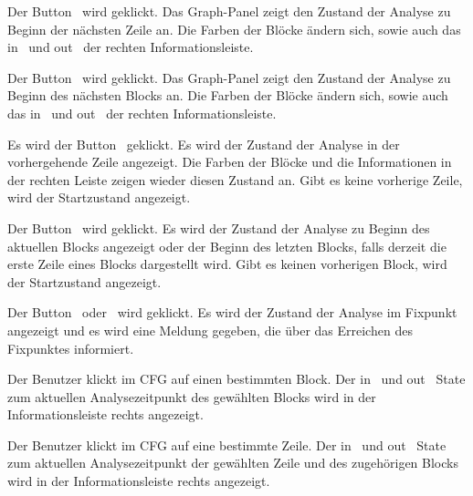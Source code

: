 {Der Button \faStepForward\ wird geklickt.}
{Das Graph-Panel zeigt den Zustand der Analyse zu Beginn der nächsten Zeile an. Die Farben der Blöcke ändern sich, sowie auch das \glqq in \grqq\ und \glqq out \grqq\ der rechten Informationsleiste.}

{Der Button \faFastForward\ wird geklickt.}
{Das Graph-Panel zeigt den Zustand der Analyse zu Beginn des nächsten Blocks an. Die Farben der Blöcke ändern sich, sowie auch das \glqq in \grqq\ und \glqq out \grqq\ der rechten Informationsleiste.}

{Es wird der Button \faStepBackward\ geklickt.}
{Es wird der Zustand der Analyse in der vorhergehende Zeile angezeigt. Die Farben der Blöcke und die Informationen in der rechten Leiste zeigen wieder diesen Zustand an. Gibt es keine vorherige Zeile, wird der Startzustand angezeigt.}

{Der Button \faFastBackward\ wird geklickt.}
{Es wird der Zustand der Analyse zu Beginn des aktuellen Blocks angezeigt oder der Beginn des letzten Blocks, falls derzeit die erste Zeile eines Blocks dargestellt wird. Gibt es keinen vorherigen Block, wird der Startzustand angezeigt.}

{Der Button \faStepForward\ oder \faFastForward\ wird geklickt.}
{Es wird der Zustand der Analyse im Fixpunkt angezeigt und es wird eine Meldung gegeben, die über das Erreichen des Fixpunktes informiert.}



{Der Benutzer klickt im CFG auf einen bestimmten Block.}
{Der \glqq in \grqq\ und \glqq out \grqq\ State zum aktuellen Analysezeitpunkt des gewählten Blocks wird in der Informationsleiste rechts angezeigt.}

{Der Benutzer klickt im CFG auf eine bestimmte Zeile.}
{Der \glqq in \grqq\ und \glqq out \grqq\ State zum aktuellen Analysezeitpunkt der gewählten Zeile und des zugehörigen Blocks wird in der Informationsleiste rechts angezeigt.}

